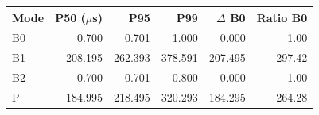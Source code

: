 \begin{tabular}{lrrrrr}
\toprule
Mode & P50 ($\mu$s) & P95 & P99 & $\Delta$ B0 & Ratio B0 \\
\midrule
B0 & 0.700 & 0.701 & 1.000 & 0.000 & 1.00 \\
B1 & 208.195 & 262.393 & 378.591 & 207.495 & 297.42 \\
B2 & 0.700 & 0.701 & 0.800 & 0.000 & 1.00 \\
P & 184.995 & 218.495 & 320.293 & 184.295 & 264.28 \\
\bottomrule
\end{tabular}
